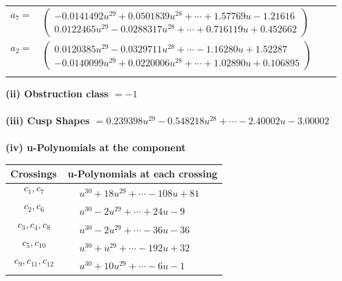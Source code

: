 \documentclass[1p]{elsarticle_modified}
\theoremstyle{definition}
\begin{document}
\begin{tabular}{m{7pt} m{180pt} m{7pt} m{180pt} }
\flushright $a_{7}=$&$\begin{pmatrix}-0.0141492 u^{29}+0.0501839 u^{28}+\cdots+1.57769 u-1.21616\\0.0122465 u^{29}-0.0288317 u^{28}+\cdots+0.716119 u+0.452662\end{pmatrix}$ \\
\flushright $a_{2}=$&$\begin{pmatrix}0.0120385 u^{29}-0.0329711 u^{28}+\cdots-1.16280 u+1.52287\\-0.0140099 u^{29}+0.0220006 u^{28}+\cdots+1.02890 u+0.106895\end{pmatrix}$\\&\end{tabular}
\flushleft \textbf{(ii) Obstruction class $= -1$}\\~\\
\flushleft \textbf{(iii) Cusp Shapes $= 0.239398 u^{29}-0.548218 u^{28}+\cdots-2.40002 u-3.00002$}\\~\\
\newpage\renewcommand{\arraystretch}{1}
\flushleft \textbf{(iv) u-Polynomials at the component}\newline \\
\begin{tabular}{m{50pt}|m{274pt}}
Crossings & \hspace{64pt}u-Polynomials at each crossing \\
\hline $$\begin{aligned}c_{1},c_{7}\end{aligned}$$&$\begin{aligned}
&u^{30}+18 u^{29}+\cdots-108 u+81
\end{aligned}$\\
\hline $$\begin{aligned}c_{2},c_{6}\end{aligned}$$&$\begin{aligned}
&u^{30}-2 u^{29}+\cdots+24 u-9
\end{aligned}$\\
\hline $$\begin{aligned}c_{3},c_{4},c_{8}\end{aligned}$$&$\begin{aligned}
&u^{30}-2 u^{29}+\cdots-36 u-36
\end{aligned}$\\
\hline $$\begin{aligned}c_{5},c_{10}\end{aligned}$$&$\begin{aligned}
&u^{30}+u^{29}+\cdots-192 u+32
\end{aligned}$\\
\hline $$\begin{aligned}c_{9},c_{11},c_{12}\end{aligned}$$&$\begin{aligned}
&u^{30}+10 u^{29}+\cdots-6 u-1
\end{aligned}$\\
\hline
\end{tabular}\\~\\
\end{document}
